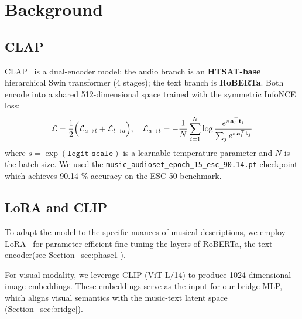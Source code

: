 \documentclass[11pt]{article}
\begin{document}
\section{Background}

\subsection{CLAP}

CLAP~\cite{elizalde2023clap} is a dual-encoder model: the audio branch is an
\textbf{HTSAT-base} hierarchical Swin transformer (4 stages); the text branch is
\textbf{RoBERTa}. Both encode into a shared 512-dimensional space trained with the
symmetric InfoNCE loss:
\begin{equation}
    \mathcal{L} = \frac{1}{2}\Bigl(
        \mathcal{L}_{a\to t} + \mathcal{L}_{t\to a}
    \Bigr), \quad
    \mathcal{L}_{a\to t} = -\frac{1}{N}\sum_{i=1}^{N}
        \log\frac{e^{s\,\mathbf{a}_i^\top\mathbf{t}_i}}
                  {\sum_{j} e^{s\,\mathbf{a}_i^\top\mathbf{t}_j}}
    \label{eq:infonce}
\end{equation}
where $s = \exp(\texttt{logit\_scale})$ is a learnable temperature parameter and $N$ is the batch size.
We used the \texttt{music\_audioset\_epoch\_15\_esc\_90.14.pt} checkpoint which achieves 90.14 \% accuracy on the ESC-50 benchmark.

\subsection{LoRA and CLIP}

To adapt the model to the specific nuances of musical descriptions, we employ LoRA~\cite{hu2022lora} for parameter efficient fine-tuning the layers of RoBERTa, the text encoder(see Section~\ref{sec:phase1}).

For visual modality, we leverage CLIP (ViT-L/14) to produce 1024-dimensional image embeddings. These embeddings serve as the input for our bridge MLP, which aligns visual semantics with the music-text latent space (Section~\ref{sec:bridge}).

\end{document}
